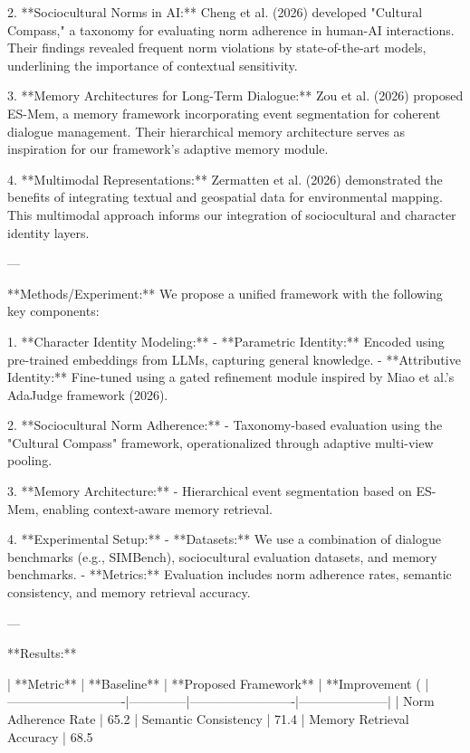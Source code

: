 2. **Sociocultural Norms in AI:**  
Cheng et al. (2026) developed "Cultural Compass," a taxonomy for evaluating norm adherence in human-AI interactions. Their findings revealed frequent norm violations by state-of-the-art models, underlining the importance of contextual sensitivity.  

3. **Memory Architectures for Long-Term Dialogue:**  
Zou et al. (2026) proposed ES-Mem, a memory framework incorporating event segmentation for coherent dialogue management. Their hierarchical memory architecture serves as inspiration for our framework's adaptive memory module.  

4. **Multimodal Representations:**  
Zermatten et al. (2026) demonstrated the benefits of integrating textual and geospatial data for environmental mapping. This multimodal approach informs our integration of sociocultural and character identity layers.  

---

**Methods/Experiment:**  
We propose a unified framework with the following key components:  

1. **Character Identity Modeling:**  
   - **Parametric Identity:** Encoded using pre-trained embeddings from LLMs, capturing general knowledge.  
   - **Attributive Identity:** Fine-tuned using a gated refinement module inspired by Miao et al.'s AdaJudge framework (2026).  

2. **Sociocultural Norm Adherence:**  
   - Taxonomy-based evaluation using the "Cultural Compass" framework, operationalized through adaptive multi-view pooling.  

3. **Memory Architecture:**  
   - Hierarchical event segmentation based on ES-Mem, enabling context-aware memory retrieval.  

4. **Experimental Setup:**  
   - **Datasets:** We use a combination of dialogue benchmarks (e.g., SIMBench), sociocultural evaluation datasets, and memory benchmarks.  
   - **Metrics:** Evaluation includes norm adherence rates, semantic consistency, and memory retrieval accuracy.  

---

**Results:**  

| **Metric**                 | **Baseline** | **Proposed Framework** | **Improvement (%
|----------------------------|--------------|-------------------------|---------------------|  
| Norm Adherence Rate        | 65.2%
| Semantic Consistency       | 71.4%
| Memory Retrieval Accuracy  | 68.5%

